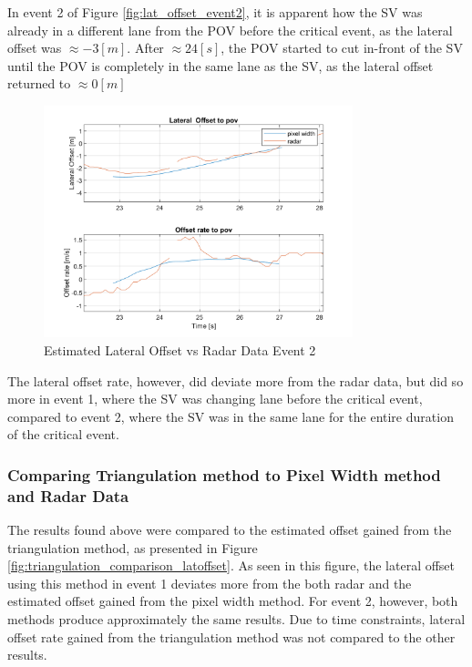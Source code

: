 In event 2 of Figure \ref{fig:lat_offset_event2}, it is apparent how the SV was already in a different lane from the POV before the critical event, as the lateral offset was $\approx -3[m]$. After $\approx 24[s]$, the POV started to cut in-front of the SV until the POV is completely in the same lane as the SV, as the lateral offset returned to $\approx 0[m]$

\begin{figure}[H]
    \centering
    \includegraphics[width=0.8\textwidth]{FiguresMat/radar_compare_lateral_116147345.png}
    \caption{Estimated Lateral Offset vs Radar Data Event 2}
    \label{fig:lat_offset_vs_radar_event2}
\end{figure}

The lateral offset rate, however,  did deviate more from the radar data, but did so more in event 1, where the SV was changing lane before the critical event, compared to event 2, where the SV was in the same lane for the entire duration of the critical event.





\subsubsection{Comparing Triangulation method to Pixel Width method and Radar Data}
The results found above were compared to the estimated offset gained from the triangulation method, as presented in Figure \ref{fig:triangulation_comparison_latoffset}. As seen in this figure, the lateral offset using this method in event 1 deviates more from the both radar and the estimated offset gained from the pixel width method. For event 2, however, both methods produce approximately the same results. Due to time constraints, lateral offset rate gained from the triangulation method was not compared to the other results. 

